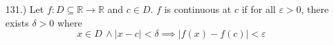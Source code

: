 \documentclass[12pt]{article}
\newcommand{\vertb}[1]{\left\vert#1\right\vert}
\newcommand{\e}{\varepsilon}
\newcommand{\lm}[1]{\displaystyle\lim_{#1}}
\begin{document}
\begin{itemize}



    \item [131.)] Let $f:D\subseteq\mathbb R\to\mathbb R$ and $c\in D$. $f$ is continuous at $c$ if for all $\e>0$, there exists $\delta>0$ where
    \[x\in D\,\land \vertb{x-c}<\delta\implies\vertb{f(x)-f(c)}<\e\]








\end{itemize}
\end{document}
